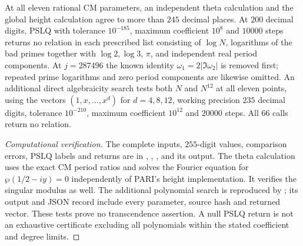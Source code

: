 \begin{statement}
At all eleven rational CM parameters, an independent theta
calculation and the global height calculation agree to more
than $245$ decimal places. At $200$ decimal digits, PSLQ
with tolerance $10^{-185}$, maximum coefficient $10^8$ and
$10000$ steps returns no relation in each prescribed list
consisting of $\log N$, logarithms of the bad primes together
with $\log2,\log3$, $\pi$, and independent real period
components. At $j=287496$ the known identity
$\omega_1=2|\Im\omega_2|$ is removed first; repeated prime
logarithms and zero period components are likewise omitted.
An additional direct algebraicity search tests both $N$ and $N^{12}$
at all eleven points, using the vectors $(1,x,\ldots,x^d)$ for
$d=4,8,12$, working precision $235$ decimal digits, tolerance
$10^{-210}$, maximum coefficient $10^{12}$ and $20000$ steps.
All $66$ calls return no relation.
\end{statement}
\begin{proof}[Computational verification]
The complete inputs, $255$-digit values, comparison errors,
PSLQ labels and returns are in
, ,
, and its output. The theta
calculation uses the exact CM period ratios and solves the
Fourier equation for $\wp(1/2-iy)=0$ independently of PARI's
height implementation. It verifies the singular modulus
as well. The additional polynomial search is reproduced by
; its output and JSON
record include every parameter, source hash and returned vector.
These tests prove no transcendence assertion. A null PSLQ return
is not an exhaustive certificate excluding all polynomials within
the stated coefficient and degree limits.
\end{proof}
